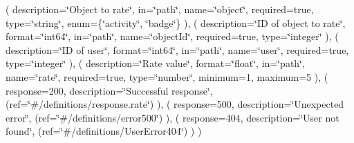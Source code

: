 ( description=\char`\"{}\+Object to rate\char`\"{}, in=\char`\"{}path\char`\"{}, name=\char`\"{}object\char`\"{}, required=true, type=\char`\"{}string\char`\"{}, enum=\{\char`\"{}activity\char`\"{}, \char`\"{}badge\char`\"{}\} ), ( description=\char`\"{}\+I\+D of object to rate\char`\"{}, format=\char`\"{}int64\char`\"{}, in=\char`\"{}path\char`\"{}, name=\char`\"{}object\+Id\char`\"{}, required=true, type=\char`\"{}integer\char`\"{} ), ( description=\char`\"{}\+I\+D of user\char`\"{}, format=\char`\"{}int64\char`\"{}, in=\char`\"{}path\char`\"{}, name=\char`\"{}user\char`\"{}, required=true, type=\char`\"{}integer\char`\"{} ), ( description=\char`\"{}\+Rate value\char`\"{}, format=\char`\"{}float\char`\"{}, in=\char`\"{}path\char`\"{}, name=\char`\"{}rate\char`\"{}, required=true, type=\char`\"{}number\char`\"{}, minimum=1, maximum=5 ), ( response=200, description=\char`\"{}\+Successful response\char`\"{}, (ref=\char`\"{}\#/definitions/response.\+rate\char`\"{}) ), ( response=500, description=\char`\"{}\+Unexpected error\char`\"{}, (ref=\char`\"{}\#/definitions/error500\char`\"{}) ), ( response=404, description=\char`\"{}\+User not found\char`\"{}, (ref=\char`\"{}\#/definitions/\+User\+Error404\char`\"{}) ) ) 
